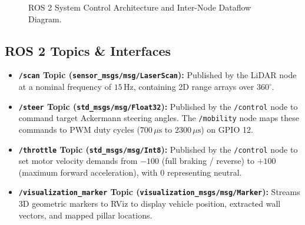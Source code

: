 \documentclass[12pt,a4paper]{article}
\begin{document}
\begin{figure}[h!]
\caption{ROS 2 System Control Architecture and Inter-Node Dataflow Diagram.}
\label{fig:control_architecture}
\end{figure}

\subsection{ROS 2 Topics \& Interfaces}
\begin{itemize}
    \item \textbf{\texttt{/scan} Topic (\texttt{sensor\_msgs/msg/LaserScan}):} Published by the LiDAR node at a nominal frequency of $15\,\text{Hz}$, containing 2D range arrays over $360^\circ$.
    \item \textbf{\texttt{/steer} Topic (\texttt{std\_msgs/msg/Float32}):} Published by the \texttt{/control} node to command target Ackermann steering angles. The \texttt{/mobility} node maps these commands to PWM duty cycles ($700\,\mu\text{s}$ to $2300\,\mu\text{s}$) on GPIO 12.
    \item \textbf{\texttt{/throttle} Topic (\texttt{std\_msgs/msg/Int8}):} Published by the \texttt{/control} node to set motor velocity demands from $-100$ (full braking / reverse) to $+100$ (maximum forward acceleration), with $0$ representing neutral.
    \item \textbf{\texttt{/visualization\_marker} Topic (\texttt{visualization\_msgs/msg/Marker}):} Streams 3D geometric markers to RViz to display vehicle position, extracted wall vectors, and mapped pillar locations.
\end{itemize}
\end{document}
